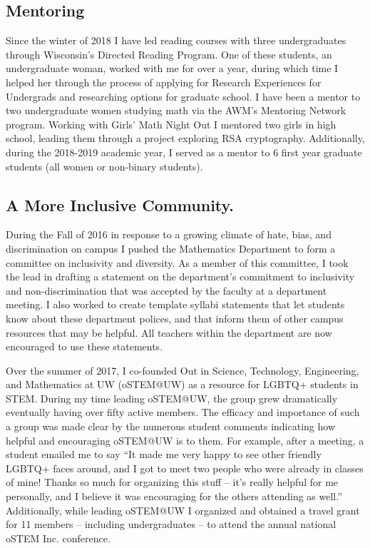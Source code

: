 \documentclass[10pt,reqno]{amsart}
\theoremstyle{remark}
\begin{document}
\subsection{Mentoring}
Since the winter of 2018 I have led reading courses with three undergraduates through Wisconsin's Directed Reading Program. One of these students, an undergraduate woman, worked with me for over a year, during which time I helped her through the process of applying for Research Experiences for Undergrads and researching options for graduate school. I have been a mentor to two undergraduate women studying math via the AWM's Mentoring Network program. Working with Girls' Math Night Out I mentored two girls in high school, leading them through a project exploring RSA cryptography. Additionally, during the 2018-2019 academic year, I served as a mentor to 6 first year graduate students (all women or non-binary students). 


\subsection{A More Inclusive Community.} During the Fall of 2016 in response to a growing climate of hate, bias, and discrimination on campus I pushed the Mathematics Department to form a committee on inclusivity and diversity. As a member of this committee, I took the lead in drafting a statement on the department's commitment to inclusivity and non-discrimination that was  accepted by the faculty at a department meeting. I also worked to create template syllabi statements that let students know about these department polices, and that inform them of other campus resources that may be helpful. All teachers within the department are now encouraged to use these statements. 

Over the summer of 2017, I co-founded Out in Science, Technology, Engineering, and Mathematics at UW (oSTEM@UW) as a resource for LGBTQ+ students in STEM. During my time leading oSTEM@UW, the group grew dramatically eventually having over fifty active members. The efficacy and importance of such a group was made clear by the numerous student comments indicating how helpful and encouraging oSTEM@UW is to them. For example, after a meeting, a student emailed me to say ``It made me very happy to see other friendly LGBTQ+ faces around, and I got to meet two people who were already in classes of mine! Thanks so much for organizing this stuff -- it's really helpful for me personally, and I believe it was encouraging for the others attending as well.'' Additionally, while leading oSTEM@UW I organized and obtained a travel grant for 11 members -- including undergraduates -- to attend the annual national oSTEM Inc. conference. 
\end{document}

